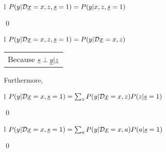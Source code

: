 \begin{claim}
\label{cl-decTransportTrivial}
\decTransportTrivial
\end{claim}
\proof
\begin{longtable}{l}
\color{red}
$P(y|\cald\rvx=x, z, \rvs=1)=
P(y|x, z, \rvs=1)$
\\
\xymatrix{
\\=
}
\end{longtable}
\qed

\begin{claim}
\label{cl-decTransportDirect}
\decTransportDirect
\end{claim}
\proof
\begin{longtable}{l}
\color{red}
$P(y|\cald\rvx=x, z, \rvs=1)=
P(y|\cald\rvx=x, z)$
\\
\xymatrix{\\=}
\begin{tabular}{l}
Because $\rvs\perp\rvy|\rvz$
\end{tabular}
\end{longtable}
Furthermore,
\begin{longtable}{l}
\color{red}
$P(y|\cald \rvx=x, \rvs=1)
=\sum_z P(y|\cald\rvx=x,z)P(z|\rvs=1)$
\\
\end{longtable}
\qed

\begin{claim}
\label{cl-decTransportBox}
\decTransportBox
\end{claim}
\proof
\begin{longtable}{l}
\color{red}$
P(y|\cald\rvx=x, \rvs=1)
=\sum_{a}
P(y|\cald\rvx=x,a)P(a|\rvs=1)$
\\
\xymatrix{\\=}
\end{longtable}
\qed


